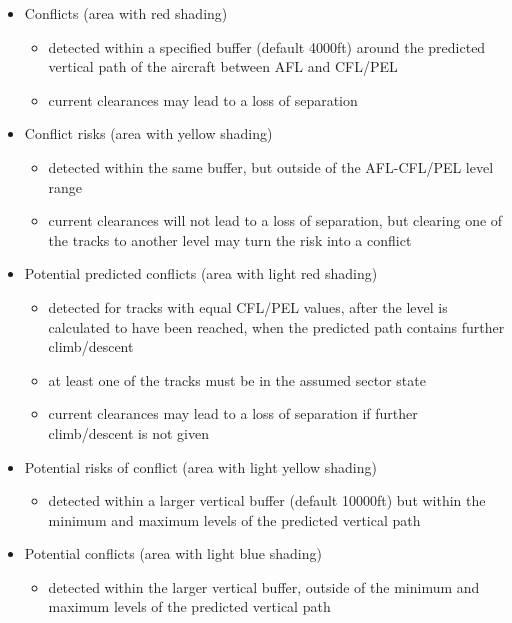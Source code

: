\documentclass[11pt,a4paper]{memoir}
\begin{document}
\begin{itemize}
    \item Conflicts (area with red shading)
    \begin{itemize}
        \item detected within a specified buffer (default 4000ft) around the predicted vertical path of the aircraft between AFL and CFL/PEL
        \item current clearances may lead to a loss of separation
    \end{itemize}
    \item Conflict risks (area with yellow shading)
    \begin{itemize}
        \item detected within the same buffer, but outside of the AFL-CFL/PEL level range
        \item current clearances will not lead to a loss of separation, but clearing one of the tracks to another level may turn the risk into a conflict
    \end{itemize}
    \item Potential predicted conflicts (area with light red shading)
    \begin{itemize}
        \item detected for tracks with equal CFL/PEL values, after the level is calculated to have been reached, when the predicted path contains further climb/descent
        \item at least one of the tracks must be in the assumed sector state
        \item current clearances may lead to a loss of separation if further climb/descent is not given
    \end{itemize}
    \item Potential risks of conflict (area with light yellow shading)
    \begin{itemize}
        \item detected within a larger vertical buffer (default 10000ft) but within the minimum and maximum levels of the predicted vertical path
    \end{itemize}
    \item Potential conflicts (area with light blue shading)
    \begin{itemize}
        \item detected within the larger vertical buffer, outside of the minimum and maximum levels of the predicted vertical path
    \end{itemize}
\end{itemize}
\end{document}
